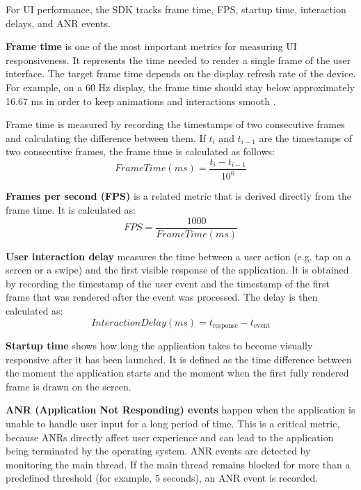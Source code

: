 For UI performance, the SDK tracks frame time, FPS, startup time, interaction delays, and ANR events.

\textbf{Frame time} is one of the most important metrics for measuring UI responsiveness. It represents the time needed to render a single frame of the user interface. The target frame time depends on the display refresh rate of the device. For example, on a 60 Hz display, the frame time should stay below approximately 16.67 ms in order to keep animations and interactions smooth \cite{AndroidVitals}.

Frame time is measured by recording the timestamps of two consecutive frames and calculating the difference between them. If $t_i$ and $t_{i-1}$ are the timestamps of two consecutive frames, the frame time is calculated as follows:
\begin{equation}
    FrameTime(ms) = \frac{t_i - t_{i-1}}{10^6}
\end{equation}

\textbf{Frames per second (FPS)} is a related metric that is derived directly from the frame time. It is calculated as:
\begin{equation}
    FPS = \frac{1000}{FrameTime(ms)}
\end{equation}

\textbf{User interaction delay} measures the time between a user action (e.g. tap on a screen or a swipe) and the first visible response of the application. It is obtained by recording the timestamp of the user event and the timestamp of the first frame that was rendered after the event was processed. The delay is then calculated as:
\begin{equation}
    InteractionDelay(ms) = t_{\text{response}} - t_{\text{event}}
\end{equation}

\textbf{Startup time} shows how long the application takes to become visually responsive after it has been launched. It is defined as the time difference between the moment the application starts and the moment when the first fully rendered frame is drawn on the screen.

\textbf{ANR (Application Not Responding) events} happen when the application is unable to handle user input for a long period of time. This is a critical metric, because ANRs directly affect user experience and can lead to the application being terminated by the operating system. ANR events are detected by monitoring the main thread. If the main thread remains blocked for more than a predefined threshold (for example, 5 seconds), an ANR event is recorded.

